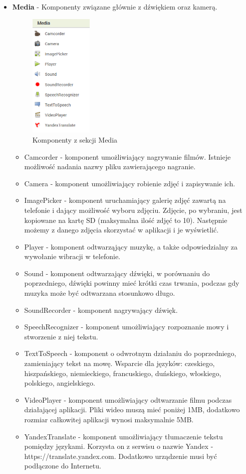 \begin{itemize}
\item \textbf{Media} - Komponenty związane głównie z dźwiękiem oraz kamerą.
\begin{figure}[H] 
\centering\includegraphics[height=6cm]{figures/components/media}
\caption{Komponenty z sekcji Media}
\end{figure}

\begin{itemize}
\item Camcorder - komponent umożliwiający nagrywanie filmów. Istnieje możliwość nadania nazwy pliku zawierającego nagranie.
\item Camera - komponent umożliwiający robienie zdjęć i zapisywanie ich.
\item ImagePicker - komponent uruchamiający galerię zdjęć zawartą na telefonie i dający możliwość wyboru zdjęciu. Zdjęcie, po wybraniu, jest kopiowane na kartę SD (maksymalna ilość zdjęć to 10). Następnie możemy z danego zdjęcia skorzystać w aplikacji i je wyświetlić.
\item Player - komponent odtwarząjący muzykę, a także odpowiedzialny za wywołanie wibracji w telefonie.
\item Sound - komponent odtwarzający dźwięki, w porównaniu do poprzedniego, dźwięki powinny mieć krótki czas trwania, podczas gdy muzyka może być odtwarzana stosunkowo długo.
\item SoundRecorder - komponent nagrywający dźwięk.
\item SpeechRecognizer - komponent umożliwiający rozpoznanie mowy i stworzenie z niej tekstu.
\item TextToSpeech - komponent o odwrotnym działaniu do poprzedniego, zamieniający tekst na mowę. Wsparcie dla języków: czeskiego, hiszpańskiego, niemieckiego, francuskiego, duńskiego, włoskiego, polskiego, angielskiego.
\item VideoPlayer - komponent umożliwiający odtwarzanie filmu podczas działającej aplikacji. Pliki wideo muszą mieć poniżej 1MB, dodatkowo rozmiar całkowitej aplikacji wynosi maksymalnie 5MB.
\item YandexTranslate - komponent umożliwiający tłumaczenie tekstu pomiędzy językami. Korzysta on z serwisu o nazwie Yandex - https://translate.yandex.com. Dodatkowo urządzenie musi być podłączone do Internetu. 
\end{itemize}



\end{itemize}
